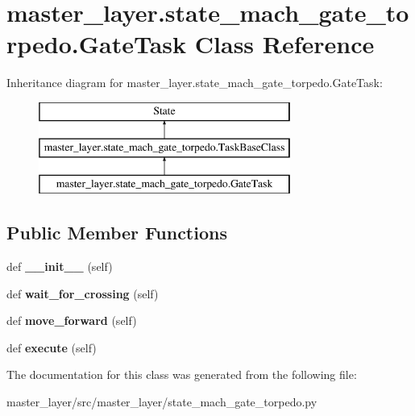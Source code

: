 \hypertarget{classmaster__layer_1_1state__mach__gate__torpedo_1_1GateTask}{}\section{master\+\_\+layer.\+state\+\_\+mach\+\_\+gate\+\_\+torpedo.\+Gate\+Task Class Reference}
\label{classmaster__layer_1_1state__mach__gate__torpedo_1_1GateTask}
Inheritance diagram for master\+\_\+layer.\+state\+\_\+mach\+\_\+gate\+\_\+torpedo.\+Gate\+Task\+:\begin{figure}[H]
\begin{center}
\leavevmode
\includegraphics[height=3.000000cm]{classmaster__layer_1_1state__mach__gate__torpedo_1_1GateTask}
\end{center}
\end{figure}
\subsection*{Public Member Functions}
\begin{DoxyCompactItemize}
\item 
\mbox{\label{classmaster__layer_1_1state__mach__gate__torpedo_1_1GateTask_a61b799fcb1c3add55187a4bc631929cd}} 
def {\bfseries \+\_\+\+\_\+init\+\_\+\+\_\+} (self)
\item 
\mbox{\label{classmaster__layer_1_1state__mach__gate__torpedo_1_1GateTask_ad837696bba16c665b25497aa76717eae}} 
def {\bfseries wait\+\_\+for\+\_\+crossing} (self)
\item 
\mbox{\label{classmaster__layer_1_1state__mach__gate__torpedo_1_1GateTask_a9439565557a79294e004e6a63de032d7}} 
def {\bfseries move\+\_\+forward} (self)
\item 
\mbox{\label{classmaster__layer_1_1state__mach__gate__torpedo_1_1GateTask_aca1234ad1e776c9d0e251ea20e0d5633}} 
def {\bfseries execute} (self)
\end{DoxyCompactItemize}


The documentation for this class was generated from the following file\+:\begin{DoxyCompactItemize}
\item 
master\+\_\+layer/src/master\+\_\+layer/state\+\_\+mach\+\_\+gate\+\_\+torpedo.\+py\end{DoxyCompactItemize}
